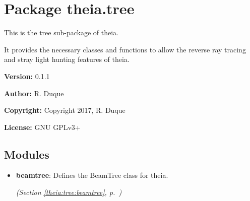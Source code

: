 %
%
%


\section{Package theia.tree}

    \label{theia:tree}
This is the tree sub-package of theia.

It provides the necessary classes and functions to allow the reverse ray 
tracing and stray light hunting features of theia.

\textbf{Version:} 0.1.1



\textbf{Author:} R. Duque



\textbf{Copyright:} Copyright 2017, R. Duque



\textbf{License:} GNU GPLv3+





\subsection{Modules}

\begin{itemize}
\setlength{\parskip}{0ex}
\item \textbf{beamtree}: Defines the BeamTree class for theia.



  \textit{(Section \ref{theia:tree:beamtree}, p.~\pageref{theia:tree:beamtree})}

\end{itemize}

